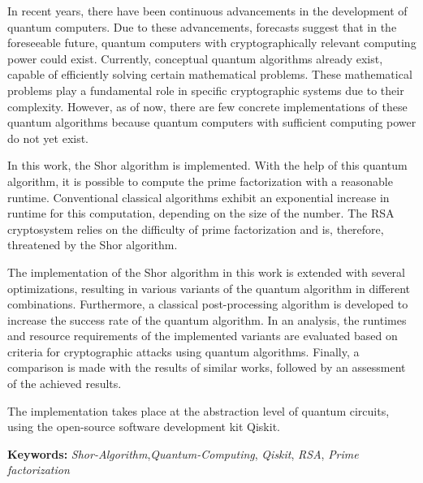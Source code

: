 In recent years, there have been continuous advancements in the development of quantum computers. 
Due to these advancements, forecasts suggest that in the foreseeable future, 
quantum computers with cryptographically relevant computing power could exist. 
Currently, conceptual quantum algorithms already exist, capable of efficiently solving certain mathematical problems. 
These mathematical problems play a fundamental role in specific cryptographic systems due to their complexity. 
However, as of now, 
there are few concrete implementations of these quantum algorithms because quantum computers with sufficient computing power do not yet exist.

In this work, the Shor algorithm is implemented. With the help of this quantum algorithm, 
it is possible to compute the prime factorization with a reasonable runtime. 
Conventional classical algorithms exhibit an exponential increase in runtime for this computation, 
depending on the size of the number. 
The RSA cryptosystem relies on the difficulty of prime factorization and is, 
therefore, threatened by the Shor algorithm.

The implementation of the Shor algorithm in this work is extended with several optimizations, 
resulting in various variants of the quantum algorithm in different combinations. 
Furthermore, a classical post-processing algorithm is developed to increase the success rate of the quantum algorithm. 
In an analysis, 
the runtimes and resource requirements of the implemented variants are evaluated based on criteria for cryptographic attacks using quantum algorithms. 
Finally, a comparison is made with the results of similar works, followed by an assessment of the achieved results.

The implementation takes place at the abstraction level of quantum circuits, using the open-source software development kit Qiskit.

\textbf{Keywords:} \textit{Shor-Algorithm},\textit{Quantum-Computing}, \textit{Qiskit}, \textit{RSA}, \textit{Prime factorization}